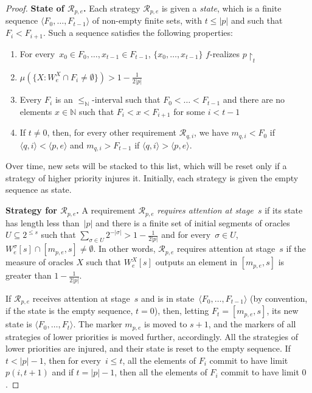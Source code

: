 \documentclass{article}
\numberwithin{theorem}{section}
\newcommand{\R}{\mathcal{R}}
\newcommand{\uh}{\upharpoonright}
\newcommand{\NN}[0]{\mathbb{N}}
\begin{document}
\begin{proof}
\textbf{State of $\R_{p,e}$.}
Each strategy $\R_{p, e}$ is given a \emph{state}, which is a finite sequence $\langle F_0, \dots, F_{t-1}\rangle$ of non-empty finite sets, with $t \leq |p|$ and such that $F_i < F_{i+1}$. Such a sequence satisfies the following properties:
\begin{enumerate}
    \item[(P1)] For every~$x_0 \in F_0, \dots, x_{t-1} \in F_{t-1}$, $\{x_0, \dots, x_{t-1}\}$ $f$-realizes $p \uh_t$
    \item[(P2)] $\mu(\{ X : W_e^X \cap F_i \neq \emptyset \}) > 1-\frac{1}{2|p|}$
    \item[(P3)] Every $F_i$ is an $\leq_{\NN}$-interval such that $F_0 <\dots < F_{t-1}$ and there are no elements $x \in \NN$ such that $F_i < x < F_{i+1}$ for some $i < t- 1$
    \item[(P4)] If $t \neq 0$, then, for every other requirement $\R_{q,i}$, we have $m_{q,i} < F_0$ if $\langle q,i \rangle < \langle p, e \rangle$ and $m_{q,i} > F_{t-1}$ if $\langle q,i \rangle > \langle p, e \rangle$.
\end{enumerate}
Over time, new sets will be stacked to this list, which will be reset only if a strategy of higher priority injures it. Initially, each strategy is given the empty sequence as state.


\smallskip

\textbf{Strategy for $\R_{p,e}$.}
A requirement $\R_{p, e}$ \emph{requires attention at stage~$s$} if its state has length less than~$|p|$ and there is a finite set of initial segments of oracles $U \subseteq 2^{\leq s}$ such that $\sum_{\sigma \in U} 2^{-|\sigma|} > 1-\frac{1}{2|p|}$ and for every~$\sigma \in U$, $W_e^\sigma[s] \cap [m_{p,e}, s] \neq \emptyset$. In other words, $\R_{p,e}$ requires attention at stage~$s$ if the measure of oracles $X$ such that $W_e^X[s]$ outputs an element in $[m_{p,e}, s]$ is greater than $1-\frac{1}{2|p|}$.

If $\R_{p,e}$ receives attention at stage~$s$ and is in state~$\langle F_0, \dots, F_{t-1} \rangle$ (by convention, if the state is the empty sequence, $t = 0$), then, letting $F_t = [m_{p,e}, s]$, its new state is $\langle F_0, \dots, F_t \rangle$. The marker $m_{p,e}$ is moved to $s+1$, and the markers of all strategies of lower priorities is moved further, accordingly. All the strategies of lower priorities are injured, and their state is reset to the empty sequence. If $t < |p|-1$, then for every~$i \leq t$, all the elements of $F_i$ commit to have limit $p(i, t+1)$ and if $t = |p| - 1$, then all the elements of $F_i$ commit to have limit $0$.
\smallskip


\end{proof}
\end{document}
